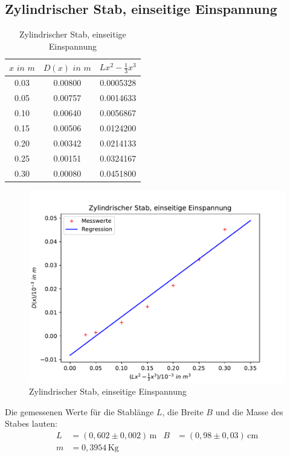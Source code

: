 \subsection{Zylindrischer Stab, einseitige Einspannung}
\begin{table}
  \centering
  \caption{Zylindrischer Stab, einseitige Einspannung}
  \label{tab:data2}
  \begin{tabular}{c c c  }
    \toprule $x \, \,  in \,\, m$ & $D(x) \,\, in \,\,  m$ & $Lx^2-\frac{1}{3}x^3$ \\
    \midrule
    0.03 & 0.00800 & 0.0005328\\
    0.05 & 0.00757 & 0.0014633\\
    0.10 & 0.00640 & 0.0056867\\
    0.15 & 0.00506 & 0.0124200\\
    0.20 & 0.00342 & 0.0214133\\
    0.25 & 0.00151 & 0.0324167\\
    0.30 & 0.00080 & 0.0451800\\
    \bottomrule
  \end{tabular}
\end{table}
\begin{figure}
  \centering
  \includegraphics[width=\textwidth]{plot2.pdf}
  \caption{Zylindrischer Stab, einseitige Einspannung}
  \label{fig:2}
\end{figure}
Die gemessenen Werte für die Stablänge $L$,
die Breite $B$ und  die Masse des Stabes lauten:
\begin{align}
  L &= (0,602 \pm 0,002)\, \mathrm{m} & B &= (0,98 \pm 0,03) \, \mathrm{cm} \\
  m &= 0,3954 \, \mathrm{Kg} \label{eqn:9}
\end{align}

